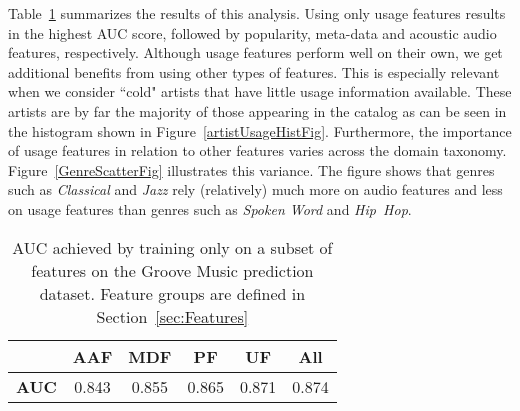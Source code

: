 Table~\ref{tab:features_AUC} summarizes the  results of this analysis. Using only usage features results in the highest AUC score, followed by popularity, meta-data and acoustic audio features, respectively. Although usage features perform well on their own, we get additional benefits from using other types of features. This is especially relevant when we consider ``cold" artists that have little usage information available. These artists are by far the majority of those appearing in the catalog as can be seen in the histogram shown in Figure~\ref{artistUsageHistFig}.  Furthermore, the importance of usage features in relation to other features varies across the domain taxonomy. Figure~\ref{GenreScatterFig} illustrates this variance. The figure shows that genres such as \textit{Classical} and \textit{Jazz} rely (relatively) much more on audio features and less on usage features than genres such as \textit{Spoken Word} and \textit{Hip~Hop}.


\begin{table}[h!]
\begin{center}
	\begin{tabular}{|c|c|c|c|c|c|}
		\hline
		 & {\bf AAF} & {\bf MDF} & {\bf PF} & {\bf UF} & {\bf All}\\ 
		\hline
		 {\bf AUC} & 0.843  & 0.855 & 0.865 & 0.871 & 0.874\\ 
		\hline
	\end{tabular}
	\vspace{-0.4cm}
\end{center}
\caption{AUC achieved by training only on a subset of features on the Groove Music prediction dataset. Feature groups are defined in Section~\ref{sec:Features}}
\label{tab:features_AUC}
\end{table}











